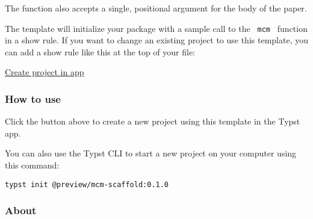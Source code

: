 The function also accepts a single, positional argument for the body of
the paper.

The template will initialize your package with a sample call to the
\texttt{\ mcm\ } function in a show rule. If you want to change an
existing project to use this template, you can add a show rule like this
at the top of your file:

\begin{Shaded}
\begin{Highlighting}[]

\NormalTok{  summary: [}
    
    

\NormalTok{  ],}
\NormalTok{)}

\end{Highlighting}
\end{Shaded}

\href{/app?template=mcm-scaffold&version=0.1.0}{Create project in app}

\subsubsection{How to use}\label{how-to-use}

Click the button above to create a new project using this template in
the Typst app.

You can also use the Typst CLI to start a new project on your computer
using this command:

\begin{verbatim}
typst init @preview/mcm-scaffold:0.1.0
\end{verbatim}



\subsubsection{About}\label{about}

